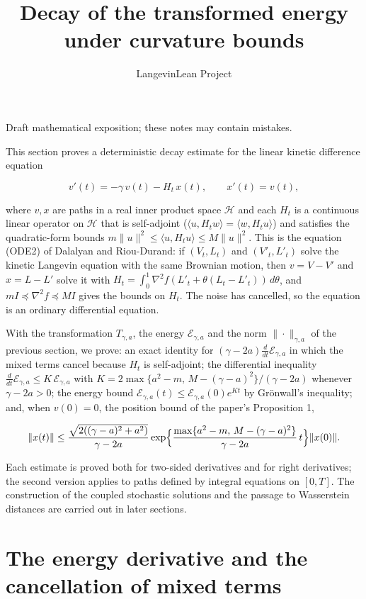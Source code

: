 \documentclass[11pt,a4paper]{article}
\title{\texorpdfstring{Decay of the transformed energy under curvature bounds}{Decay of the transformed energy under curvature bounds}}
\author{LangevinLean Project}
\date{}
\begin{document}
\maketitle
Draft mathematical exposition; these notes may contain mistakes.


This section proves a deterministic decay estimate for the linear kinetic difference equation


\[v'(t)=-\gamma\,v(t)-H_t\,x(t),\qquad x'(t)=v(t),\]


where \(v,x\) are paths in a real inner product space \(\mathcal H\) and each \(H_t\) is a continuous linear operator on \(\mathcal H\) that is self-adjoint (\(\langle u,H_tw\rangle=\langle w,H_tu\rangle\)) and satisfies the quadratic-form bounds \(m\|u\|^2\le\langle u,H_tu\rangle\le M\|u\|^2\). This is the equation (ODE2) of Dalalyan and Riou-Durand: if \((V_t,L_t)\) and \((V'_t,L'_t)\) solve the kinetic Langevin equation with the same Brownian motion, then \(v=V-V'\) and \(x=L-L'\) solve it with \(H_t=\int_0^1\nabla^2f(L'_t+\theta(L_t-L'_t))\,d\theta\), and \(mI\preceq\nabla^2f\preceq MI\) gives the bounds on \(H_t\). The noise has cancelled, so the equation is an ordinary differential equation.




With the transformation \(T_{\gamma,a}\), the energy \(\mathcal E_{\gamma,a}\) and the norm \(\|\cdot\|_{\gamma,a}\) of the previous section, we prove: an exact identity for \((\gamma-2a)\frac{d}{dt}\mathcal E_{\gamma,a}\) in which the mixed terms cancel because \(H_t\) is self-adjoint; the differential inequality \(\frac{d}{dt}\mathcal E_{\gamma,a}\le K\,\mathcal E_{\gamma,a}\) with \(K=2\max\{a^2-m,\,M-(\gamma-a)^2\}/(\gamma-2a)\) whenever \(\gamma-2a>0\); the energy bound \(\mathcal E_{\gamma,a}(t)\le\mathcal E_{\gamma,a}(0)e^{Kt}\) by Grönwall's inequality; and, when \(v(0)=0\), the position bound of the paper's Proposition 1,


\[\|x(t)\|\le\frac{\sqrt{2((\gamma-a)^2+a^2)}}{\gamma-2a}\exp\Bigl\{\frac{\max\{a^2-m,\,M-(\gamma-a)^2\}}{\gamma-2a}\,t\Bigr\}\|x(0)\|.\]


Each estimate is proved both for two-sided derivatives and for right derivatives; the second version applies to paths defined by integral equations on \([0,T]\). The construction of the coupled stochastic solutions and the passage to Wasserstein distances are carried out in later sections.


\section{\texorpdfstring{The energy derivative and the cancellation of mixed terms}{The energy derivative and the cancellation of mixed terms}}
\end{document}
